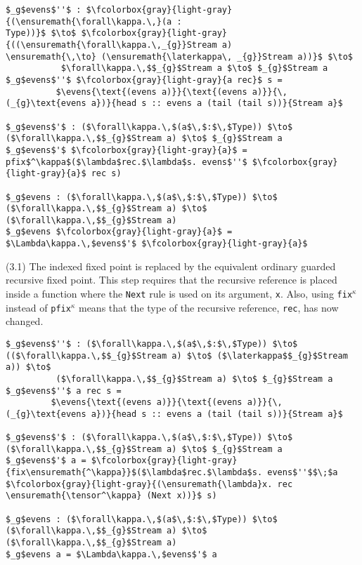 \begin{lstlisting}[mathescape, title=\ttBlock]
$_g$evens$''$ : $\fcolorbox{gray}{light-gray}{(\ensuremath{\forall\kappa.\,}(a :
Type))}$ $\to$ $\fcolorbox{gray}{light-gray}{((\ensuremath{\forall\kappa.\,_{g}}Stream a)
\ensuremath{\,\to} (\ensuremath{\laterkappa\, _{g}}Stream a))}$ $\to$ 
           $\forall\kappa.\,$$_{g}$Stream a $\to$ $_{g}$Stream a
$_g$evens$''$ $\fcolorbox{gray}{light-gray}{a rec}$ s =
          $\evens{\text{(evens a)}}{\text{(evens a)}}{\,(_{g}\text{evens a})}{head s :: evens a (tail (tail s))}{Stream a}$

$_g$evens$'$ : ($\forall\kappa.\,$(a$\,$:$\,$Type)) $\to$ ($\forall\kappa.\,$$_{g}$Stream a) $\to$ $_{g}$Stream a
$_g$evens$'$ $\fcolorbox{gray}{light-gray}{a}$ = pfix$^\kappa$($\lambda$rec.$\lambda$s. evens$''$ $\fcolorbox{gray}{light-gray}{a}$ rec s)

$_g$evens : ($\forall\kappa.\,$(a$\,$:$\,$Type)) $\to$ ($\forall\kappa.\,$$_{g}$Stream a) $\to$ ($\forall\kappa.\,$$_{g}$Stream a)
$_g$evens $\fcolorbox{gray}{light-gray}{a}$ = $\Lambda\kappa.\,$evens$'$ $\fcolorbox{gray}{light-gray}{a}$
\end{lstlisting}
(3.1) The indexed fixed point is replaced by the equivalent ordinary guarded
recursive fixed point. This step requires that the recursive reference is
placed inside a function where the \texttt{Next} rule is used on its
argument, \texttt{x}. Also, using \texttt{fix$^\kappa$} instead of
\texttt{pfix$^\kappa$} means that the type of the recursive reference,
\texttt{rec}, has now changed.
\begin{lstlisting}[mathescape, title=\ttBlock]
$_g$evens$''$ : ($\forall\kappa.\,$(a$\,$:$\,$Type)) $\to$ (($\forall\kappa.\,$$_{g}$Stream a) $\to$ ($\laterkappa$$_{g}$Stream a)) $\to$ 
          ($\forall\kappa.\,$$_{g}$Stream a) $\to$ $_{g}$Stream a
$_g$evens$''$ a rec s =
         $\evens{\text{(evens a)}}{\text{(evens a)}}{\,(_{g}\text{evens a})}{head s :: evens a (tail (tail s))}{Stream a}$

$_g$evens$'$ : ($\forall\kappa.\,$(a$\,$:$\,$Type)) $\to$ ($\forall\kappa.\,$$_{g}$Stream a) $\to$ $_{g}$Stream a
$_g$evens$'$ a = $\fcolorbox{gray}{light-gray}{fix\ensuremath{^\kappa}}$($\lambda$rec.$\lambda$s. evens$''$$\;$a $\fcolorbox{gray}{light-gray}{(\ensuremath{\lambda}x. rec \ensuremath{\tensor^\kappa} (Next x))}$ s)

$_g$evens : ($\forall\kappa.\,$(a$\,$:$\,$Type)) $\to$ ($\forall\kappa.\,$$_{g}$Stream a) $\to$ ($\forall\kappa.\,$$_{g}$Stream a)
$_g$evens a = $\Lambda\kappa.\,$evens$'$ a
\end{lstlisting}
